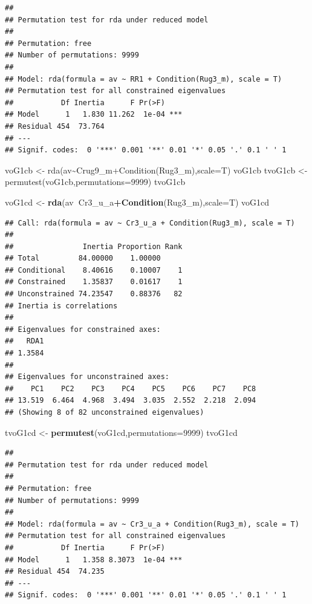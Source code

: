 \documentclass[]{article}
\newenvironment{Shaded}{\begin{snugshade}}{\end{snugshade}}
\newcommand{\DataTypeTok}[1]{\textcolor[rgb]{0.13,0.29,0.53}{#1}}
\newcommand{\DecValTok}[1]{\textcolor[rgb]{0.00,0.00,0.81}{#1}}
\newcommand{\KeywordTok}[1]{\textcolor[rgb]{0.13,0.29,0.53}{\textbf{#1}}}
\newcommand{\NormalTok}[1]{#1}
\newcommand{\OperatorTok}[1]{\textcolor[rgb]{0.81,0.36,0.00}{\textbf{#1}}}
\newcommand{\StringTok}[1]{\textcolor[rgb]{0.31,0.60,0.02}{#1}}
\begin{document}
\begin{verbatim}
## 
## Permutation test for rda under reduced model 
## 
## Permutation: free
## Number of permutations: 9999
##  
## Model: rda(formula = av ~ RR1 + Condition(Rug3_m), scale = T)
## Permutation test for all constrained eigenvalues
##           Df Inertia      F Pr(>F)    
## Model      1   1.830 11.262  1e-04 ***
## Residual 454  73.764                  
## ---
## Signif. codes:  0 '***' 0.001 '**' 0.01 '*' 0.05 '.' 0.1 ' ' 1
\end{verbatim}

voG1cb \textless{}-
rda(av\textasciitilde{}Crug9\_m+Condition(Rug3\_m),scale=T) voG1cb
tvoG1cb \textless{}- permutest(voG1cb,permutations=9999) tvoG1cb

\begin{Shaded}
\begin{Highlighting}[]
\NormalTok{voG1cd <-}\StringTok{ }\KeywordTok{rda}\NormalTok{(av}\OperatorTok{~}\NormalTok{Cr3_u_a}\OperatorTok{+}\KeywordTok{Condition}\NormalTok{(Rug3_m),}\DataTypeTok{scale=}\NormalTok{T)}
\NormalTok{voG1cd}
\end{Highlighting}
\end{Shaded}

\begin{verbatim}
## Call: rda(formula = av ~ Cr3_u_a + Condition(Rug3_m), scale = T)
## 
##                Inertia Proportion Rank
## Total         84.00000    1.00000     
## Conditional    8.40616    0.10007    1
## Constrained    1.35837    0.01617    1
## Unconstrained 74.23547    0.88376   82
## Inertia is correlations 
## 
## Eigenvalues for constrained axes:
##   RDA1 
## 1.3584 
## 
## Eigenvalues for unconstrained axes:
##    PC1    PC2    PC3    PC4    PC5    PC6    PC7    PC8 
## 13.519  6.464  4.968  3.494  3.035  2.552  2.218  2.094 
## (Showing 8 of 82 unconstrained eigenvalues)
\end{verbatim}

\begin{Shaded}
\begin{Highlighting}[]
\NormalTok{tvoG1cd <-}\StringTok{ }\KeywordTok{permutest}\NormalTok{(voG1cd,}\DataTypeTok{permutations=}\DecValTok{9999}\NormalTok{)}
\NormalTok{tvoG1cd}
\end{Highlighting}
\end{Shaded}

\begin{verbatim}
## 
## Permutation test for rda under reduced model 
## 
## Permutation: free
## Number of permutations: 9999
##  
## Model: rda(formula = av ~ Cr3_u_a + Condition(Rug3_m), scale = T)
## Permutation test for all constrained eigenvalues
##           Df Inertia      F Pr(>F)    
## Model      1   1.358 8.3073  1e-04 ***
## Residual 454  74.235                  
## ---
## Signif. codes:  0 '***' 0.001 '**' 0.01 '*' 0.05 '.' 0.1 ' ' 1
\end{verbatim}
\end{document}
